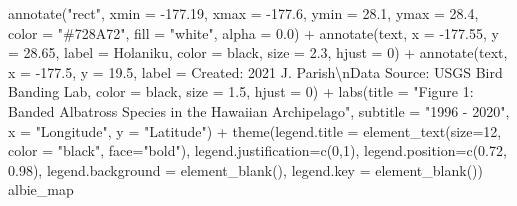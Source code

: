 \documentclass[
]{article}
\newenvironment{Shaded}{\begin{snugshade}}{\end{snugshade}}
\newcommand{\AttributeTok}[1]{\textcolor[rgb]{0.77,0.63,0.00}{#1}}
\newcommand{\DecValTok}[1]{\textcolor[rgb]{0.00,0.00,0.81}{#1}}
\newcommand{\FloatTok}[1]{\textcolor[rgb]{0.00,0.00,0.81}{#1}}
\newcommand{\FunctionTok}[1]{\textcolor[rgb]{0.00,0.00,0.00}{#1}}
\newcommand{\NormalTok}[1]{#1}
\newcommand{\SpecialCharTok}[1]{\textcolor[rgb]{0.00,0.00,0.00}{#1}}
\newcommand{\StringTok}[1]{\textcolor[rgb]{0.31,0.60,0.02}{#1}}
\begin{document}
\begin{Shaded}
\begin{Highlighting}[]
  \FunctionTok{annotate}\NormalTok{(}\StringTok{"rect"}\NormalTok{, }\AttributeTok{xmin =} \SpecialCharTok{{-}}\FloatTok{177.19}\NormalTok{, }\AttributeTok{xmax =} \SpecialCharTok{{-}}\FloatTok{177.6}\NormalTok{, }\AttributeTok{ymin =} \FloatTok{28.1}\NormalTok{, }\AttributeTok{ymax =} \FloatTok{28.4}\NormalTok{, }
           \AttributeTok{color =} \StringTok{"\#728A72"}\NormalTok{, }\AttributeTok{fill =} \StringTok{"white"}\NormalTok{, }\AttributeTok{alpha =} \FloatTok{0.0}\NormalTok{) }\SpecialCharTok{+}
  \FunctionTok{annotate}\NormalTok{(}\StringTok{\textquotesingle{}text\textquotesingle{}}\NormalTok{, }\AttributeTok{x =} \SpecialCharTok{{-}}\FloatTok{177.55}\NormalTok{, }\AttributeTok{y =} \FloatTok{28.65}\NormalTok{, }
           \AttributeTok{label =} \StringTok{\textquotesingle{}Holaniku\textquotesingle{}}\NormalTok{, }\AttributeTok{color =} \StringTok{\textquotesingle{}black\textquotesingle{}}\NormalTok{, }\AttributeTok{size =} \FloatTok{2.3}\NormalTok{, }\AttributeTok{hjust =} \DecValTok{0}\NormalTok{) }\SpecialCharTok{+}
  \FunctionTok{annotate}\NormalTok{(}\StringTok{\textquotesingle{}text\textquotesingle{}}\NormalTok{, }\AttributeTok{x =} \SpecialCharTok{{-}}\FloatTok{177.5}\NormalTok{, }\AttributeTok{y =} \FloatTok{19.5}\NormalTok{, }
           \AttributeTok{label =} \StringTok{\textquotesingle{}Created: 2021 J. Parish}\SpecialCharTok{\textbackslash{}n}\StringTok{Data Source: USGS Bird Banding Lab\textquotesingle{}}\NormalTok{, }
           \AttributeTok{color =} \StringTok{\textquotesingle{}black\textquotesingle{}}\NormalTok{, }\AttributeTok{size =} \FloatTok{1.5}\NormalTok{, }\AttributeTok{hjust =} \DecValTok{0}\NormalTok{) }\SpecialCharTok{+}
  \FunctionTok{labs}\NormalTok{(}\AttributeTok{title =} \StringTok{"Figure 1: Banded Albatross Species in the Hawaiian Archipelago"}\NormalTok{,}
        \AttributeTok{subtitle =} \StringTok{"1996 {-} 2020"}\NormalTok{,}
        \AttributeTok{x =} \StringTok{"Longitude"}\NormalTok{,}
        \AttributeTok{y =} \StringTok{"Latitude"}\NormalTok{) }\SpecialCharTok{+}
  \FunctionTok{theme}\NormalTok{(}\AttributeTok{legend.title =} \FunctionTok{element\_text}\NormalTok{(}\AttributeTok{size=}\DecValTok{12}\NormalTok{, }\AttributeTok{color =} \StringTok{"black"}\NormalTok{, }\AttributeTok{face=}\StringTok{"bold"}\NormalTok{),}
           \AttributeTok{legend.justification=}\FunctionTok{c}\NormalTok{(}\DecValTok{0}\NormalTok{,}\DecValTok{1}\NormalTok{), }
           \AttributeTok{legend.position=}\FunctionTok{c}\NormalTok{(}\FloatTok{0.72}\NormalTok{, }\FloatTok{0.98}\NormalTok{),}
           \AttributeTok{legend.background =} \FunctionTok{element\_blank}\NormalTok{(),}
           \AttributeTok{legend.key =} \FunctionTok{element\_blank}\NormalTok{())}
\NormalTok{albie\_map}
\end{Highlighting}
\end{Shaded}
\end{document}

